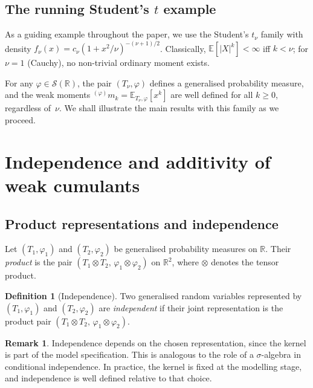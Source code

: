 \documentclass[12pt]{article}
\theoremstyle{definition}
\newtheorem{definition}[theorem]{Definition}
\newtheorem{remark}[theorem]{Remark}
\newcommand{\R}{\mathbb{R}}
\newcommand{\E}{\mathbb{E}}
\begin{document}
\subsection{The running Student's \texorpdfstring{$t$}{t} example}
\label{subsec:preliminaries_kernel_t}

As a guiding example throughout the paper, we use the Student's $t_\nu$ family with density $f_\nu(x)=c_\nu(1+x^2/\nu)^{-(\nu+1)/2}$.  Classically, $\E[|X|^k]<\infty$ iff $k<\nu$; for $\nu=1$ (Cauchy), no non-trivial ordinary moment exists.

For any $\varphi\in\mathcal{S}(\R)$, the pair $(T_\nu,\varphi)$ defines a generalised probability measure, and the weak moments ${}^{(\varphi)}m_k = \E_{T_\nu,\varphi}[x^k]$ are well defined for all $k\geq 0$, regardless of~$\nu$.  We shall illustrate the main results with this family as we proceed.


\section{Independence and additivity of weak cumulants}
\label{sec:independence}

\subsection{Product representations and independence}
\label{subsec:independence_product}

Let $(T_1,\varphi_1)$ and $(T_2,\varphi_2)$ be generalised probability measures on $\R$.  Their \emph{product} is the pair $(T_1\otimes T_2,\,\varphi_1\otimes\varphi_2)$ on $\R^2$, where $\otimes$ denotes the tensor product.

\begin{definition}[Independence]
Two generalised random variables represented by $(T_1,\varphi_1)$ and $(T_2,\varphi_2)$ are \emph{independent} if their joint representation is the product pair $(T_1\otimes T_2,\,\varphi_1\otimes\varphi_2)$.
\end{definition}

\begin{remark}
Independence depends on the chosen representation, since the kernel is part of the model specification.  This is analogous to the role of a $\sigma$-algebra in conditional independence.  In practice, the kernel is fixed at the modelling stage, and independence is well defined relative to that choice.
\end{remark}
\end{document}
